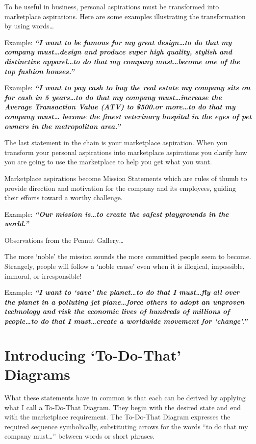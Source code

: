 \documentclass[
]{book}
\begin{document}
To be useful in business, personal aspirations must be transformed into marketplace aspirations. Here are some examples illustrating the transformation by using words\ldots{}

{Example: \textbf{\emph{``I want to be famous for my great design\ldots to do that my company must\ldots design and produce super high quality, stylish and distinctive apparel\ldots to do that my company must\ldots become one of the top fashion houses.''}}}

{Example: \textbf{\emph{``I want to pay cash to buy the real estate my company sits on for cash in 5 years\ldots to do that my company must\ldots increase the Average Transaction Value (ATV) to \$500.or more\ldots to do that my company must\ldots{} become the finest veterinary hospital in the eyes of pet owners in the metropolitan area.''}}}

The last statement in the chain is your marketplace aspiration. When you transform your personal aspirations into marketplace aspirations you clarify how you are going to use the marketplace to help you get what you want.

Marketplace aspirations become Mission Statements which are rules of thumb to provide direction and motivation for the company and its employees, guiding their efforts toward a worthy challenge.

{Example: \textbf{\emph{``Our mission is\ldots to create the safest playgrounds in the world.''}}}

Observations from the Peanut Gallery\ldots{}

The more `noble' the mission sounds the more committed people seem to become. Strangely, people will follow a `noble cause' even when it is illogical, impossible, immoral, or irresponsible!

{Example: \textbf{\emph{``I want to `save' the planet\ldots to do that I must\ldots fly all over the planet in a polluting jet plane\ldots force others to adopt an unproven technology and risk the economic lives of hundreds of millions of people\ldots to do that I must\ldots create a worldwide movement for `change'.''}}}

\hypertarget{introducing-to-do-that-diagrams}{%
\section{Introducing `To-Do-That' Diagrams}\label{introducing-to-do-that-diagrams}}

What these statements have in common is that
each can be derived by applying what I call a To-Do-That Diagram. They begin with the desired state and end with the marketplace requirement. The To-Do-That Diagram expresses the required sequence symbolically, substituting arrows for the words ``to do that my company must\ldots{}'' between words or short phrases.
\end{document}
